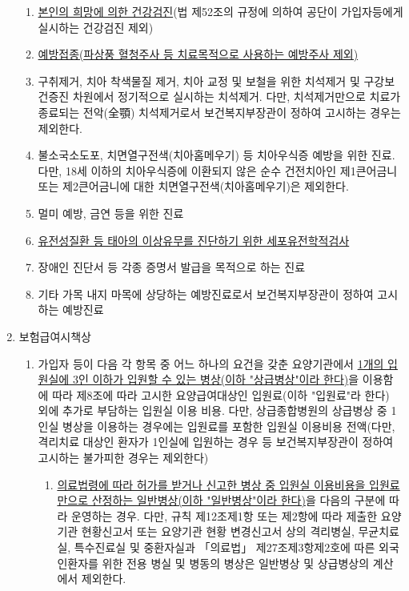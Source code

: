 \begin{enumerate}[1.]
	\begin{enumerate}[가.]\tightlist
	\item \uline{본인의 희망에 의한 건강검진}(법 제52조의 규정에 의하여 공단이 가입자등에게 실시하는 건강검진 제외)
	\item \uline{예방접종(파상풍 혈청주사 등 치료목적으로 사용하는 예방주사 제외)}
	\item 구취제거, 치아 착색물질 제거, 치아 교정 및 보철을 위한 치석제거 및 구강보건증진 차원에서 정기적으로 실시하는 치석제거. 다만, 치석제거만으로 치료가 종료되는 전악(全顎) 치석제거로서 보건복지부장관이 정하여 고시하는 경우는 제외한다.
	\item 불소국소도포, 치면열구전색(치아홈메우기) 등 치아우식증 예방을 위한 진료. 다만, 18세 이하의 치아우식증에 이환되지 않은 순수 건전치아인 제1큰어금니 또는 제2큰어금니에 대한 치면열구전색(치아홈메우기)은 제외한다.
	\item 멀미 예방, 금연 등을 위한 진료
	\item \uline{유전성질환 등 태아의 이상유무를 진단하기 위한 세포유전학적검사}
	\item 장애인 진단서 등 각종 증명서 발급을 목적으로 하는 진료
	\item 기타 가목 내지 마목에 상당하는 예방진료로서 보건복지부장관이 정하여 고시하는 예방진료
	\end{enumerate}
\item 보험급여시책상 
	\begin{enumerate}[가.]\tightlist
	\item 가입자 등이 다음 각 항목 중 어느 하나의 요건을 갖춘 요양기관에서 \uline{1개의 입원실에 3인 이하가 입원할 수 있는 병상(이하 "상급병상"이라 한다)}을 이용함에 따라 제8조에 따라 고시한 요양급여대상인 입원료(이하 "입원료"라 한다) 외에 추가로 부담하는 입원실 이용 비용. 다만, 상급종합병원의 상급병상 중 1인실 병상을 이용하는 경우에는 입원료를 포함한 입원실 이용비용 전액(다만, 격리치료 대상인 환자가 1인실에 입원하는 경우 등 보건복지부장관이 정하여 고시하는 불가피한 경우는 제외한다)
    		\begin{enumerate}[(1)]\tightlist
    		\item \uline{의료법령에 따라 허가를 받거나 신고한 병상 중 입원실 이용비용을 입원료만으로 산정하는 일반병상(이하 "일반병상"이라 한다)}을 다음의 구분에 따라 운영하는 경우. 다만, 규칙 제12조제1항 또는 제2항에 따라 제출한 요양기관 현황신고서 또는 요양기관 현황 변경신고서 상의 격리병실, 무균치료실, 특수진료실 및 중환자실과 「의료법」 제27조제3항제2호에 따른 외국인환자를 위한 전용 병실 및 병동의 병상은 일반병상 및 상급병상의 계산에서 제외한다.

\end{enumerate}
\end{enumerate}
\end{enumerate}

